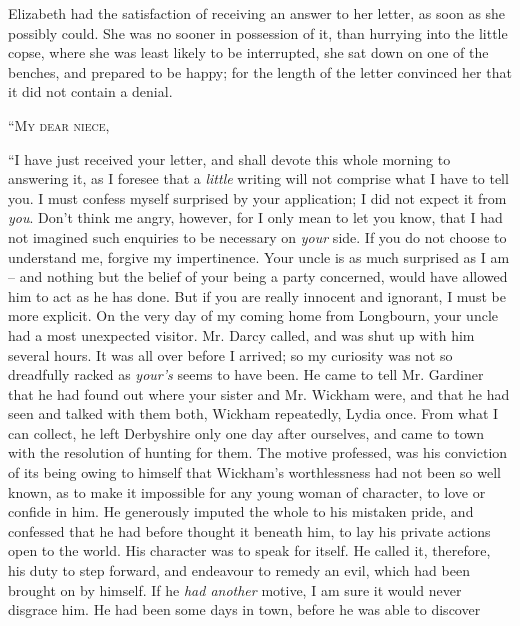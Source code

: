 
Elizabeth had the satisfaction of receiving an answer
to her letter, as soon as she possibly could. She was no
sooner in possession of it, than hurrying into the little
copse, where she was least likely to be interrupted, she
sat down on one of the benches, and prepared to be happy;
for the length of the letter convinced her that it did not
contain a denial.

\begin{letter}

“\textsc{My dear niece},

“I have just received your letter, and shall devote this
whole morning to answering it, as I foresee that a \textit{little}
writing will not comprise what I have to tell you. I must
confess myself surprised by your application; I did not
expect it from \textit{you}. Don’t think me angry, however, for I
only mean to let you know, that I had not imagined such
enquiries to be necessary on \textit{your} side. If you do not
choose to understand me, forgive my impertinence. Your
uncle is as much surprised as I am -- and nothing but the
belief of your being a party concerned, would have allowed
him to act as he has done. But if you are really innocent
and ignorant, I must be more explicit. On the very day
of my coming home from Longbourn, your uncle had a
most unexpected visitor. Mr. Darcy called, and was shut
up with him several hours. It was all over before I arrived;
so my curiosity was not so dreadfully racked as \textit{your’s}
seems to have been. He came to tell Mr. Gardiner that
he had found out where your sister and Mr. Wickham were,
and that he had seen and talked with them both, Wickham
repeatedly, Lydia once. From what I can collect, he left
Derbyshire only one day after ourselves, and came to
town with the resolution of hunting for them. The motive
professed, was his conviction of its being owing to himself
that Wickham’s worthlessness had not been so well known,
as to make it impossible for any young woman of character,
to love or confide in him. He generously imputed the
whole to his mistaken pride, and confessed that he
had before thought it beneath him, to lay his private
actions open to the world. His character was to speak
for itself. He called it, therefore, his duty to step
forward, and endeavour to remedy an evil, which had
been brought on by himself. If he \textit{had another} motive,
I am sure it would never disgrace him. He had
been some days in town, before he was able to discover

\end{letter}
